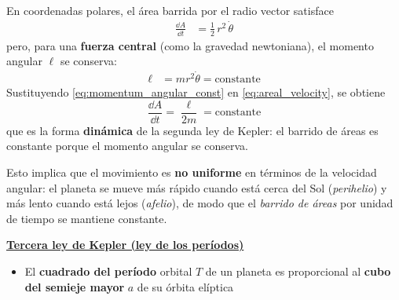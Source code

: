 \documentclass{article}
\begin{document}
En coordenadas polares, el área barrida por el radio vector satisface
\begin{equation}
\begin{split}
\frac{\dd A}{\dd t}
&= \frac{1}{2}\,r^{2}\,\dot\theta
\end{split}\label{eq:areal_velocity}
\end{equation}
pero, para una \textcolor{Tarawera}{\textbf{fuerza central}} (como la gravedad newtoniana),
el momento angular \(\ell\) se conserva:
\begin{equation}
\begin{split}
\ell
&= m r^{2}\dot\theta
= \text{constante}
\end{split}\label{eq:momentum_angular_const}
\end{equation}
Sustituyendo \eqref{eq:momentum_angular_const} en \eqref{eq:areal_velocity}, se obtiene
\begin{equation}
\boxed{
\frac{\dd A}{\dd t}
= \frac{\ell}{2m}
= \text{constante}
}
\label{eq:areal_velocity_const}
\end{equation}
que es la forma \textcolor{Lochinvar}{\textbf{dinámica}} de la segunda ley de Kepler: el barrido de áreas
es constante porque el momento angular se conserva.

Esto implica que el movimiento es \textcolor{trueblue}{\textbf{no uniforme}} en términos de la velocidad
angular: el planeta se mueve más rápido cuando está cerca del Sol (\emph{perihelio})
y más lento cuando está lejos (\emph{afelio}), de modo que el \emph{barrido de áreas}
por unidad de tiempo se mantiene constante.

\vspace{0.4cm}

\noindent
\textcolor{Lochinvar}{\textbf{\underline{Tercera ley de Kepler (ley de los períodos)}}}

\begin{itemize}
  \item[$\bullet$]
  El \textcolor{Cinnabar}{\textbf{cuadrado del período}} orbital \(T\) de un planeta es
  proporcional al \textcolor{Apple Green}{\textbf{cubo del semieje mayor}} \(a\) de su órbita elíptica
\end{itemize}
\end{document}

